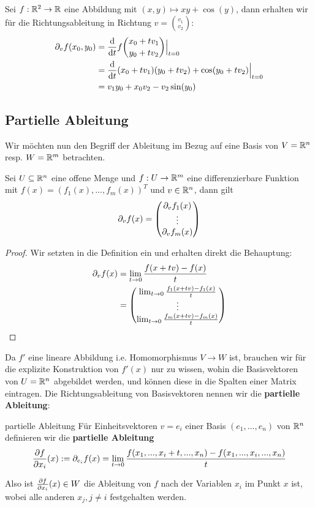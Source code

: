 \begin{example}
Sei $f: \mathbb{R}^2 \to \mathbb{R}$ eine Abbildung mit $(x,y) \mapsto xy + \cos(y)$, dann erhalten wir für die Richtungsableitung in Richtung $v = \binom{v_1}{v_2}$:
\begin{align*}
    \partial_vf(x_0,y_0) &= \diff{}{t} f\binom{x_0 + tv_1}{y_0 + tv_2}\Big\vert_{t=0}\\
    &= \diff{}{t} (x_0 + tv_1)(y_0 + tv_2) + \cos(y_0 + tv_2) \Big\vert_{t=0}\\
    &= v_1 y_0 + x_0v_2 - v_2 \sin (y_0)
\end{align*}
\end{example}

\subsection{Partielle Ableitung}
Wir möchten nun den Begriff der Ableitung im Bezug auf eine Basis von $V = \mathbb{R}^n$ resp. $W = \mathbb{R}^m$ betrachten.

\begin{lemma}{}{}
Sei $U \subseteq \mathbb{R}^n$ eine offene Menge und $f: U \to \mathbb{R}^m$ eine differenzierbare Funktion mit $f(x) = (f_1(x), ..., f_m(x))^T$ und $v\in \mathbb{R}^n$, dann gilt
$$\partial_vf(x) = \begin{pmatrix}\partial_vf_1(x)\\ \vdots \\ \partial_v f_m(x)\end{pmatrix}$$
\end{lemma}
\begin{proof} Wir setzten in die Definition ein und erhalten direkt die Behauptung:
\begin{align*}
    \partial_vf(x) &= \lim_{t\to 0} \frac{f(x+tv) -f(x)}{t}\\
    &= \begin{pmatrix}\lim_{t\to 0} \frac{f_1(x+tv) -f_1(x)}{t}\\ \vdots \\ \lim_{t\to 0} \frac{f_m(x+tv) -f_m(x)}{t}\end{pmatrix}
\end{align*}
\end{proof}
Da $f'$ eine lineare Abbildung i.e. Homomorphismus $V \to W$ ist, brauchen wir für die explizite Konstruktion von $f'(x)$ nur zu wissen, wohin die Basisvektoren von $U = \mathbb{R}^n$ abgebildet werden, und können diese in die Spalten einer Matrix eintragen. Die Richtungsableitung von Basisvektoren nennen wir die \textbf{partielle Ableitung}:
\begin{definition}{partielle Ableitung}{}
Für Einheitsvektoren $v = e_i$ einer Basis $(e_1, ..., e_n)$ von $\mathbb{R}^n$ definieren wir die \textbf{partielle Ableitung}
$$\diffp{f}{x_i}(x) := \partial_{e_i}f(x) = \lim_{t\to 0}\frac{f(x_1, ..., x_{i}+t, ..., x_n) - f(x_1, ..., x_{i}, ..., x_n)}{t}$$
\end{definition}
Also ist $\diffp{f}{x_i}(x) \in W$ die Ableitung von $f$ nach der Variablen $x_i$ im Punkt $x$ ist, wobei alle anderen $x_j, j\neq i$ festgehalten werden.

